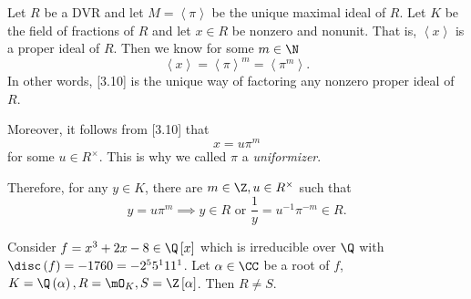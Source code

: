\documentclass[pmath441]{subfiles}
\begin{document}
    \begin{boxyrecall}{}
        Let $R$ be a DVR and let $M=\left< \pi \right>$ be the unique maximal ideal of $R$. Let $K$ be the field of fractions of $R$ and let $x\in R$ be nonzero and nonunit. That is, $\left< x \right>$ is a proper ideal of $R$. Then we know for some $m\in\N$
        \begin{equation}
            \left< x \right> = \left< \pi \right>^m = \left< \pi^m \right>. 
        \end{equation}
        In other words, [3.10] is the unique way of factoring any nonzero proper ideal of $R$.

        Moreover, it follows from [3.10] that
        \begin{equation*}
            x = u\pi^m
        \end{equation*}
        for some $u\in R^{\times}$. This is why we called $\pi$ a \textit{uniformizer}. 
    \end{boxyrecall}

    Therefore, for any $y\in K$, there are $m\in\Z,u\in R^{\times}$ such that
    \begin{equation}
        y = u\pi^m \implies y\in R \text{ or } \frac{1}{y} = u^{-1}\pi^{-m}\in R.
    \end{equation}

    \begin{example}{}
        Consider $f=x^{3}+2x-8\in\Q\left[ x \right]$ which is irreducible over $\Q$ with $\disc\left( f \right) = -1760 = -2^55^111^1$. Let $\alpha\in\CC$ be a root of $f$, $K=\Q\left( \alpha \right), R=\mO_K, S=\Z\left[ \alpha \right]$. Then $R\neq S$.
    \end{example}
\end{document}

